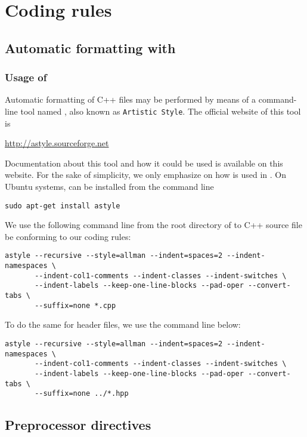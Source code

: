 


\chapter{Coding rules}


\section{Automatic formatting with \Astyle}

\subsection{Usage of \Astyle}

Automatic formatting of C++ files may be performed by means of a command-line tool named \Astyle, also known as \texttt{Artistic Style}. The official website of this tool is 
\begin{center}
\url{http://astyle.sourceforge.net}
\end{center}
Documentation about this tool and how it could be used is available on this website. For the sake of simplicity, we only emphasize on how \Astyle is used in \Simol. On Ubuntu systems, \Astyle can be installed from the command line
\begin{verbatim}
sudo apt-get install astyle
\end{verbatim}
We use the following command line from the root directory of \Simol to C++ source file be conforming to our coding rules:
\begin{verbatim}
astyle --recursive --style=allman --indent=spaces=2 --indent-namespaces \
       --indent-col1-comments --indent-classes --indent-switches \
       --indent-labels --keep-one-line-blocks --pad-oper --convert-tabs \
       --suffix=none *.cpp
\end{verbatim}
To do the same for header files, we use the command line below:
\begin{verbatim}
astyle --recursive --style=allman --indent=spaces=2 --indent-namespaces \
       --indent-col1-comments --indent-classes --indent-switches \
       --indent-labels --keep-one-line-blocks --pad-oper --convert-tabs \
       --suffix=none ../*.hpp
\end{verbatim}



\section{Preprocessor directives}


